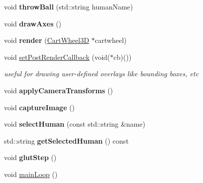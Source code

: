 \begin{DoxyCompactItemize}
\item 
\hypertarget{classCartWheel_1_1Visualization_a2f94b4b61e9a9ba0128bb27377a6af1b}{
void {\bfseries throwBall} (std::string humanName)}
\label{classCartWheel_1_1Visualization_a2f94b4b61e9a9ba0128bb27377a6af1b}

\item 
\hypertarget{classCartWheel_1_1Visualization_a6bb006454024ec8e22cc59dfaac1129f}{
void {\bfseries drawAxes} ()}
\label{classCartWheel_1_1Visualization_a6bb006454024ec8e22cc59dfaac1129f}

\item 
\hypertarget{classCartWheel_1_1Visualization_a0a31c77e939c8b41062852429d96fefa}{
void {\bfseries render} (\hyperlink{classCartWheel_1_1CartWheel3D}{CartWheel3D} $\ast$cartwheel)}
\label{classCartWheel_1_1Visualization_a0a31c77e939c8b41062852429d96fefa}

\item 
\hypertarget{classCartWheel_1_1Visualization_a8313194eb5003fc595b409f5d3bfae34}{
void \hyperlink{classCartWheel_1_1Visualization_a8313194eb5003fc595b409f5d3bfae34}{setPostRenderCallback} (void($\ast$cb)())}
\label{classCartWheel_1_1Visualization_a8313194eb5003fc595b409f5d3bfae34}

\begin{DoxyCompactList}\small\item\em useful for drawing user-\/defined overlays like bounding boxes, etc \item\end{DoxyCompactList}\item 
\hypertarget{classCartWheel_1_1Visualization_a21eb9a5f71f12317a544997b7b8cde5b}{
void {\bfseries applyCameraTransforms} ()}
\label{classCartWheel_1_1Visualization_a21eb9a5f71f12317a544997b7b8cde5b}

\item 
\hypertarget{classCartWheel_1_1Visualization_a426b7f8d4e4ba8bf020a01c001cb85f0}{
void {\bfseries captureImage} ()}
\label{classCartWheel_1_1Visualization_a426b7f8d4e4ba8bf020a01c001cb85f0}

\item 
\hypertarget{classCartWheel_1_1Visualization_a1badf0a97e84d960feae3dcbd3c63e55}{
void {\bfseries selectHuman} (const std::string \&name)}
\label{classCartWheel_1_1Visualization_a1badf0a97e84d960feae3dcbd3c63e55}

\item 
\hypertarget{classCartWheel_1_1Visualization_a968e138e5d7f91642b5ebf8a709d1df5}{
std::string {\bfseries getSelectedHuman} () const }
\label{classCartWheel_1_1Visualization_a968e138e5d7f91642b5ebf8a709d1df5}

\item 
\hypertarget{classCartWheel_1_1Visualization_a8b2b9cbcda6f06249a11e31905fae717}{
void {\bfseries glutStep} ()}
\label{classCartWheel_1_1Visualization_a8b2b9cbcda6f06249a11e31905fae717}

\item 
void \hyperlink{classCartWheel_1_1Visualization_a67b0a21051ad5670a4fa6455674a290c}{mainLoop} ()
\end{DoxyCompactItemize}
